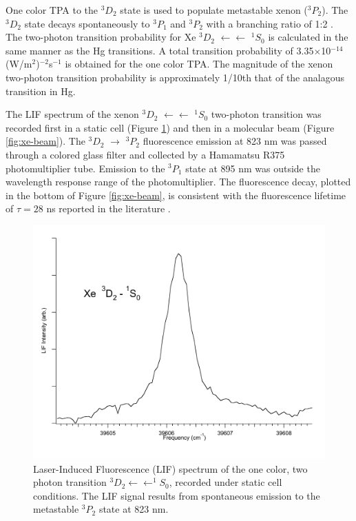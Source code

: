 One color TPA to the $^3D_2$ state is used to populate metastable
xenon ($^3P_2$).  The $^3D_2$ state decays spontaneously to $^3P_1$
and $^3P_2$ with a branching ratio of 1:2 \cite{cabrera81}.  The
two-photon transition probability for Xe $^3D_2$ $\leftarrow
\leftarrow$ $^1S_0$ is calculated in the same manner as the Hg
transitions.  A total transition probability of 3.35$\times$10$^{-14}$
(W/m$^2$)$^{-2}$s$^{-1}$ is obtained for the one color TPA.  The
magnitude of the xenon two-photon transition probability is
approximately 1/10th that of the analagous transition in Hg.

The LIF spectrum of the xenon $^3D_2$ $\leftarrow \leftarrow$ $^1S_0$
two-photon transition was recorded first in a static cell (Figure
\ref{fig:xe3d2-cell}) and then in a molecular beam (Figure
\ref{fig:xe-beam}).  The $^3D_2$ $\rightarrow$ $^3P_2$ fluorescence
emission at 823 nm was passed through a colored glass filter and
collected by a Hamamatsu R375 photomultiplier tube.  Emission to the
$^3P_1$ state at 895 nm was outside the wavelength response range of
the photomultiplier.  The fluorescence decay, plotted in the bottom of
Figure \ref{fig:xe-beam}, is consistent with the fluorescence lifetime
of $\tau = 28$ ns reported in the literature \cite{cabrera81}.

\begin{figure}
  \caption{Laser-Induced Fluorescence (LIF) spectrum of the one color,
    two photon transition  $^3D_2 \leftarrow \leftarrow
    ^1S_0$, recorded under static cell conditions.  The LIF signal
    results from spontaneous emission to the metastable $^3P_2$
    state at 823 nm.}
  \label{fig:xe3d2-cell}
  \centering
  \vspace{1cm}
  \includegraphics[width=6in]{Xe3D2-cell.pdf}
  \vspace{3cm}
\end{figure}

